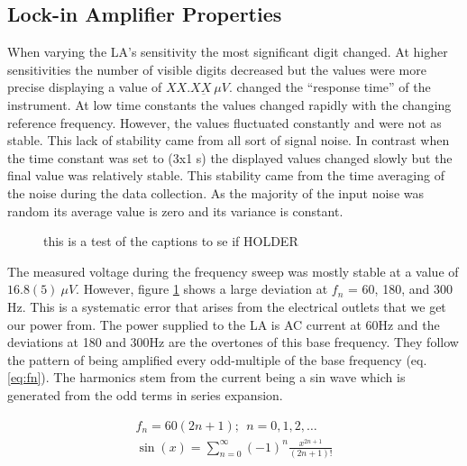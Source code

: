 \documentclass[
reprint,
amsmath,amssymb,
aps,
tikz,
border=5pt
]{revtex4-1}
\begin{document}
  \subsection*{Lock-in Amplifier Properties}

    When varying the LA's  sensitivity the most significant digit changed. At higher sensitivities the number of visible digits decreased but the values were more precise displaying a value of $XX.X\underbar{X} ~\mu V$. changed the  ``response time'' of the instrument. At low time constants the values changed rapidly with the changing reference frequency. However, the values fluctuated constantly and were not as stable. This lack of stability came from all sort of signal noise. In contrast when the time constant was set to (3x1 s) the displayed values changed slowly but the final value was relatively stable. This stability came from the time averaging of the noise during the data collection. As the majority of the input noise was random its average value is zero and its variance is constant. 


    \begin{figure}[h]
    
      \resizebox{0.45\textwidth}{!}{}
      \caption{this is a test of the captions to se if  HOLDER}
      \label{fig:freq_dep}
  
    \end{figure}

    The measured voltage during the frequency sweep was mostly stable at a value of $16.8(5) ~\mu V$. However, figure \ref{fig:freq_dep} shows a large deviation at $f_n$ = 60, 180, and 300 Hz. This is a systematic error that arises from the electrical outlets that we get our power from. The power supplied to the LA is AC current at 60Hz and the deviations at 180 and 300Hz are the overtones of this base frequency.\cite{harmonics} They follow the pattern of being amplified every odd-multiple of the base frequency (eq. \ref{eq:fn}). The harmonics stem from the current being a sin wave which is generated from the odd terms in series expansion.
    
    \begin{gather}
      f_n = 60(2n+1); ~~{n = 0, 1, 2, \dots}
      \label{eq:fn} \\
      \sin(x) = \sum_{n=0}^{\infty} \left(-1\right)^n \frac{x^{2n +1}}{(2n+1)!} \label{eq:sin_taylor}
    \end{gather}
    
\end{document}
